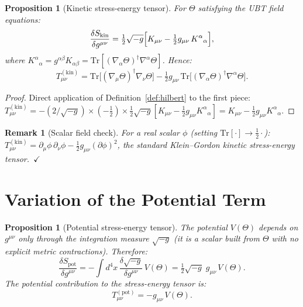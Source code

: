 \documentclass[12pt]{article}
\newtheorem{proposition}[definition]{Proposition}
\newtheorem{remark}[definition]{Remark}
\newcommand{\Tr}{\mathrm{Tr}}
\begin{document}
\begin{proposition}[Kinetic stress-energy tensor]
\label{prop:T_kin}
For $\Theta$ satisfying the UBT field equations:
\begin{equation}
  \frac{\delta S_{\mathrm{kin}}}{\delta g^{\mu\nu}}
  = \tfrac{1}{2}\sqrt{-g}\Bigl[
      K_{\mu\nu} - \tfrac{1}{2}g_{\mu\nu}\,K^\alpha{}_\alpha
    \Bigr],
\end{equation}
where $K^\alpha{}_\alpha = g^{\alpha\beta}K_{\alpha\beta}
= \Tr[(\nabla_\alpha\Theta)^\dagger\nabla^\alpha\Theta]$.
Hence:
\begin{equation}
  \label{eq:T_kin}
  \boxed{
    T^{(\mathrm{kin})}_{\mu\nu}
    = \Tr\!\bigl[(\nabla_\mu\Theta)^\dagger\nabla_\nu\Theta\bigr]
      -\tfrac{1}{2}g_{\mu\nu}\,
       \Tr\!\bigl[(\nabla_\alpha\Theta)^\dagger\nabla^\alpha\Theta\bigr].
  }
\end{equation}
\end{proposition}

\begin{proof}
  Direct application of Definition~\ref{def:hilbert} to the first piece:
  $T^{(\mathrm{kin})}_{\mu\nu} = -(2/\sqrt{-g})\times
  (-\tfrac{1}{2})\times\tfrac{1}{2}\sqrt{-g}[K_{\mu\nu} -
  \tfrac{1}{2}g_{\mu\nu}K^\alpha{}_\alpha]
  = K_{\mu\nu} - \tfrac{1}{2}g_{\mu\nu}K^\alpha{}_\alpha$.
\end{proof}

\begin{remark}[Scalar field check]
  For a real scalar $\phi$ (setting $\Tr[\cdot] \to \tfrac{1}{2}\cdot$):
  $T^{(\mathrm{kin})}_{\mu\nu} = \partial_\mu\phi\,\partial_\nu\phi
  - \tfrac{1}{2}g_{\mu\nu}(\partial\phi)^2$,
  the standard Klein--Gordon kinetic stress-energy tensor.~$\checkmark$
\end{remark}

\section{Variation of the Potential Term}
\label{sec:pot}

\begin{proposition}[Potential stress-energy tensor]
\label{prop:T_pot}
The potential $V(\Theta)$ depends on $g^{\mu\nu}$ only through the
integration measure $\sqrt{-g}$ (it is a scalar built from $\Theta$ with
no explicit metric contractions).  Therefore:
\begin{equation}
  \frac{\delta S_{\mathrm{pot}}}{\delta g^{\mu\nu}}
  = -\int d^4x\,\frac{\delta\sqrt{-g}}{\delta g^{\mu\nu}}\,V(\Theta)
  = \tfrac{1}{2}\sqrt{-g}\;g_{\mu\nu}\,V(\Theta).
\end{equation}
The potential contribution to the stress-energy tensor is:
\begin{equation}
  \label{eq:T_pot}
  \boxed{T^{(\mathrm{pot})}_{\mu\nu} = -g_{\mu\nu}\,V(\Theta).}
\end{equation}
\end{proposition}
\end{document}
